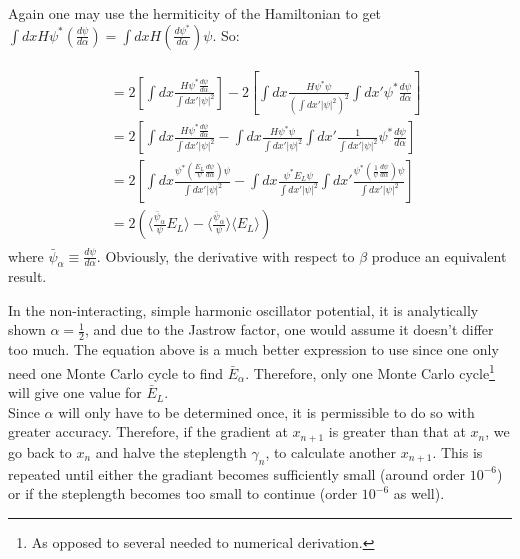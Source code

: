 \documentclass[english, a4paper]{article}
\begin{document}
	Again one may use the hermiticity of the Hamiltonian to get $\int dx H \psi^*\left(\frac{d\psi}{d\alpha}\right) = \int dx H \left(\frac{d\psi^*}{d\alpha}\right)\psi$. So:
	
	\begin{align}
	\begin{split}
	&= 2\left[ \int dx\frac{H\psi^*\frac{d\psi}{d\alpha}}{\int dx'|\psi|^2} \right] - 2\left[ \int dx \frac{H\psi^*\psi}{\left(\int dx'|\psi|^2\right)^2}\int dx' \psi^*\frac{d\psi}{d\alpha} \right]\\
	&= 2\left[ \int dx\frac{H\psi^*\frac{d\psi}{d\alpha}}{\int dx'|\psi|^2} - \int dx \frac{H\psi^*\psi}{\int dx'|\psi|^2}\int dx' \frac{1}{\int dx'|\psi|^2}\psi^*\frac{d\psi}{d\alpha} \right]\\
	&= 2\left[ \int dx\frac{\psi^*\left(\frac{E_L}{\psi}\frac{d\psi}{d\alpha}\right) \psi}{\int dx'|\psi|^2} - \int dx \frac{\psi^* E_L\psi}{\int dx'|\psi|^2}\int dx' \frac{\psi^*\left(\frac{1}{\psi}\frac{d\psi}{d\alpha}\right)\psi}{\int dx'|\psi|^2} \right]\\
	&= 2\left( \langle\frac{\bar{\psi}_\alpha}{\psi}E_L\rangle -  \langle\frac{\bar{\psi}_\alpha}{\psi}\rangle\langle E_L\rangle \right)
	\end{split}
	\end{align}
	where $\bar{\psi}_\alpha \equiv \frac{d\psi}{d\alpha}$. Obviously, the derivative with respect to $\beta$ produce an equivalent result. 
	
	
	In the non-interacting, simple harmonic oscillator potential, it is analytically shown $\alpha = \frac{1}{2}$, and due to the Jastrow factor, one would assume it doesn't differ too much.
	The equation above is a much better expression to use since one only need one Monte Carlo cycle to find $\bar{E}_\alpha$. Therefore, only one Monte Carlo cycle\footnote{As opposed to several needed to numerical derivation.} will give one value for $\bar{E}_L$.\\
	Since $\alpha$ will only have to be determined once, it is permissible to do so with greater accuracy. Therefore, if the gradient at $x_{n+1}$ is greater than that at $x_n$, we go back to $x_n$ and halve the steplength $\gamma_n$, to calculate another $x_{n+1}$.
	This is repeated until either the gradiant becomes sufficiently small (around order $10^{-6}$) or if the steplength becomes too small to continue (order $10^{-6}$ as well).
	
	
	
	
	
\end{document}
